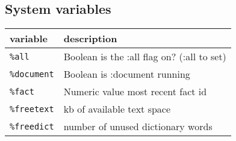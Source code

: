\documentclass[]{article}
\begin{document}
\subsection{System variables}\label{system-variables-1}

\begin{longtable}[]{@{}ll@{}}
\toprule
\begin{minipage}[b]{0.12\columnwidth}\raggedright\strut
variable\strut
\end{minipage} & \begin{minipage}[b]{0.10\columnwidth}\raggedright\strut
description\strut
\end{minipage}\tabularnewline
\midrule
\endhead
\begin{minipage}[t]{0.12\columnwidth}\raggedright\strut
\texttt{\%all}\strut
\end{minipage} & \begin{minipage}[t]{0.10\columnwidth}\raggedright\strut
Boolean is the :all flag on? (:all to set)\strut
\end{minipage}\tabularnewline
\begin{minipage}[t]{0.12\columnwidth}\raggedright\strut
\texttt{\%document}\strut
\end{minipage} & \begin{minipage}[t]{0.10\columnwidth}\raggedright\strut
Boolean is :document running\strut
\end{minipage}\tabularnewline
\begin{minipage}[t]{0.12\columnwidth}\raggedright\strut
\texttt{\%fact}\strut
\end{minipage} & \begin{minipage}[t]{0.10\columnwidth}\raggedright\strut
Numeric value most recent fact id\strut
\end{minipage}\tabularnewline
\begin{minipage}[t]{0.12\columnwidth}\raggedright\strut
\texttt{\%freetext}\strut
\end{minipage} & \begin{minipage}[t]{0.10\columnwidth}\raggedright\strut
kb of available text space\strut
\end{minipage}\tabularnewline
\begin{minipage}[t]{0.12\columnwidth}\raggedright\strut
\texttt{\%freedict}\strut
\end{minipage} & \begin{minipage}[t]{0.10\columnwidth}\raggedright\strut
number of unused dictionary words\strut
\end{minipage}\tabularnewline

\end{longtable}
\end{document}
